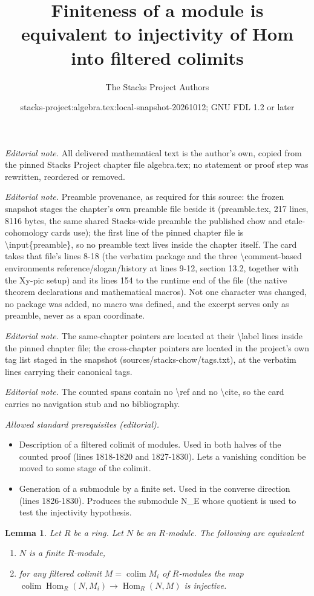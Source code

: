 \documentclass[10pt,a4paper]{amsart}
\title{Finiteness of a module is equivalent to injectivity of Hom into filtered colimits}
\author{The Stacks Project Authors}
\date{stacks-project:algebra.tex:local-snapshot-20261012; GNU FDL 1.2 or later}
\theoremstyle{plain}
\newtheorem{lemma}[subsection]{Lemma}
\theoremstyle{definition}
\theoremstyle{remark}
\numberwithin{equation}{subsection}
\def\colim{\mathop{\mathrm{colim}}\nolimits}
\def\Hom{\mathop{\mathrm{Hom}}\nolimits}
\begin{document}
\maketitle
\noindent\textit{Editorial note.} All delivered mathematical text is the author's own, copied from the pinned Stacks Project chapter file algebra.tex; no statement or proof step was rewritten, reordered or removed.\par\medskip
\noindent\textit{Editorial note.} Preamble provenance, as required for this source: the frozen snapshot stages the chapter's own preamble file beside it (preamble.tex, 217 lines, 8116 bytes, the same shared Stacks-wide preamble the published chow and etale-cohomology cards use); the first line of the pinned chapter file is \textbackslash{}input\{preamble\}, so no preamble text lives inside the chapter itself. The card takes that file's lines 8-18 (the verbatim package and the three \textbackslash{}comment-based environments reference/slogan/history at lines 9-12, section 13.2, together with the Xy-pic setup) and its lines 154 to the runtime end of the file (the native theorem declarations and mathematical macros). Not one character was changed, no package was added, no macro was defined, and the excerpt serves only as preamble, never as a span coordinate.\par\medskip
\noindent\textit{Editorial note.} The same-chapter pointers are located at their \textbackslash{}label lines inside the pinned chapter file; the cross-chapter pointers are located in the project's own tag list staged in the snapshot (sources/stacks-chow/tags.txt), at the verbatim lines carrying their canonical tags.\par\medskip
\noindent\textit{Editorial note.} The counted spans contain no \textbackslash{}ref and no \textbackslash{}cite, so the card carries no navigation stub and no bibliography.\par\medskip
\noindent\textit{Allowed standard prerequisites (editorial).}\begin{itemize}
\item Description of a filtered colimit of modules. Used in both halves of the counted proof (lines 1818-1820 and 1827-1830). Lets a vanishing condition be moved to some stage of the colimit.
\item Generation of a submodule by a finite set. Used in the converse direction (lines 1826-1830). Produces the submodule N\_E whose quotient is used to test the injectivity hypothesis.
\end{itemize}\medskip
\begin{lemma}
\label{lemma-characterize-finite-module-hom}
Let $R$ be a ring. Let $N$ be an $R$-module. The following are equivalent
\begin{enumerate}
\item $N$ is a finite $R$-module,
\item for any filtered colimit $M = \colim M_i$ of $R$-modules the map
$\colim \Hom_R(N, M_i) \to \Hom_R(N, M)$ is injective.
\end{enumerate}
\end{lemma}
\end{document}
